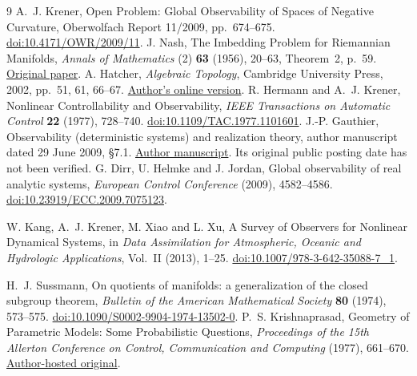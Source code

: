 \documentclass[11pt]{article}
\begin{document}
\begin{thebibliography}{9}
 A.~J. Krener, Open Problem: Global Observability of Spaces of
Negative Curvature, Oberwolfach Report 11/2009, pp.~674--675.
\href{https://doi.org/10.4171/OWR/2009/11}{doi:10.4171/OWR/2009/11}.
 J. Nash, The Imbedding Problem for Riemannian Manifolds,
\emph{Annals of Mathematics} (2) \textbf{63} (1956), 20--63, Theorem~2, p.~59.
\href{https://sites.math.rutgers.edu/~feehan/teaching/math866/nash.pdf}{Original paper}.
 A. Hatcher, \emph{Algebraic Topology}, Cambridge University
Press, 2002, pp.~51, 61, 66--67.
\href{https://pi.math.cornell.edu/~hatcher/AT/AT.pdf}{Author's online version}.
 R. Hermann and A.~J. Krener, Nonlinear Controllability and
Observability, \emph{IEEE Transactions on Automatic Control} \textbf{22}
(1977), 728--740. \href{https://doi.org/10.1109/TAC.1977.1101601}{doi:10.1109/TAC.1977.1101601}.
 J.-P. Gauthier, Observability (deterministic systems) and
realization theory, author manuscript dated
29 June 2009, \S7.1. \href{https://pageperso.lis-lab.fr/jean-paul.gauthier/papers/115.pdf}{Author manuscript}.
Its original public posting date has not been verified.
 G. Dirr, U. Helmke and J. Jordan, Global observability of real
analytic systems, \emph{European Control Conference} (2009), 4582--4586.
\href{https://doi.org/10.23919/ECC.2009.7075123}{doi:10.23919/ECC.2009.7075123}.

 W. Kang, A.~J. Krener, M. Xiao and L. Xu, A Survey of Observers
for Nonlinear Dynamical Systems, in \emph{Data Assimilation for Atmospheric,
Oceanic and Hydrologic Applications}, Vol.~II (2013), 1--25.
\href{https://doi.org/10.1007/978-3-642-35088-7_1}{doi:10.1007/978-3-642-35088-7\_1}.

 H.~J. Sussmann, On quotients of manifolds: a generalization
of the closed subgroup theorem, \emph{Bulletin of the American Mathematical
Society} \textbf{80} (1974), 573--575.
\href{https://doi.org/10.1090/S0002-9904-1974-13502-0}{doi:10.1090/S0002-9904-1974-13502-0}.
 P.~S. Krishnaprasad, Geometry of Parametric Models: Some
Probabilistic Questions, \emph{Proceedings of the 15th Allerton Conference on
Control, Communication and Computing} (1977), 661--670.
\href{https://user.eng.umd.edu/~krishna/images/allerton_1977.pdf}{Author-hosted original}.
\end{thebibliography}
\end{document}
